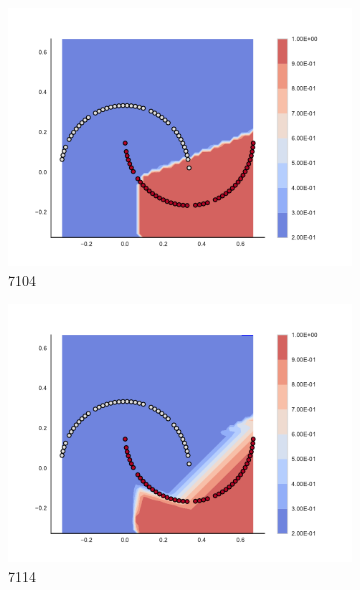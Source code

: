 \begin{figure}[h]
\begin{subfigure}[b]{0.09\textwidth}
    \includegraphics[clip, trim=2.35cm 1.75cm 4.5cm 0cm,width=\textwidth]{img/convergence/7104.pdf}
    \caption{7104}
    \label{fig:convergence_7104}
\end{subfigure}
%
\begin{subfigure}[b]{0.09\textwidth}
    \includegraphics[clip, trim=2.35cm 1.75cm 4.5cm 0cm,width=\textwidth]{img/convergence/7114.pdf}
    \caption{7114}
    \label{fig:convergence_7114}
\end{subfigure}
%
\begin{subfigure}[b]{0.09\textwidth}

\end{subfigure}
\end{figure}
